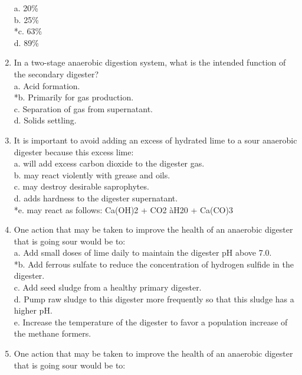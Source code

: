 \documentclass{article}
\begin{document}
\begin{enumerate}
a. 20\% \\
b. 25\% \\
*c. 63\% \\
d. 89\% \\

\item  In a two-stage anaerobic digestion system, what is the intended function of the secondary digester? \\

a. Acid formation. \\
*b. Primarily for gas production. \\
c. Separation of gas from supernatant. \\
d. Solids settling. \\

\item  It is important to avoid adding an excess of hydrated lime to a sour anaerobic digester because this excess lime: \\

a. will add excess carbon dioxide to the digester gas. \\
b. may react violently with grease and oils. \\
c. may destroy desirable saprophytes. \\
d. adds hardness to the digester supernatant. \\
*e. may react as follows: Ca(OH)2 + CO2
àH20 + Ca(CO)3 \\

\item  One action that may be taken to improve the health of an anaerobic digester that is going sour would be to: \\

a. Add small doses of lime daily to maintain the digester pH above 7.0. \\
*b. Add ferrous sulfate to reduce the concentration of hydrogen sulfide in the digester. \\
c. Add seed sludge from a healthy primary digester. \\
d. Pump raw sludge to this digester more frequently so that this sludge has a higher pH. \\
e. Increase the temperature of the digester to favor a population increase of the methane formers. \\

\item  One action that may be taken to improve the health of an anaerobic digester that is going sour would be to: \\


\end{enumerate}
\end{document}
